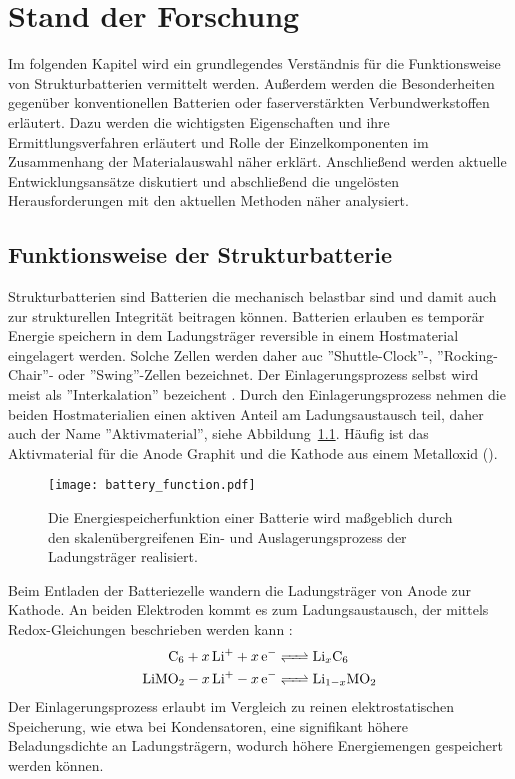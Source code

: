 \chapter{Stand der Forschung}

Im folgenden Kapitel wird ein grundlegendes Verständnis für die Funktionsweise von Strukturbatterien vermittelt werden. Außerdem werden die Besonderheiten gegenüber konventionellen Batterien oder faserverstärkten Verbundwerkstoffen erläutert. Dazu werden die wichtigsten Eigenschaften und ihre Ermittlungsverfahren erläutert und Rolle der Einzelkomponenten im Zusammenhang der Materialauswahl näher erklärt. Anschließend werden aktuelle Entwicklungsansätze diskutiert und abschließend die ungelösten Herausforderungen mit den aktuellen Methoden näher analysiert.

\section{Funktionsweise der Strukturbatterie}
Strukturbatterien sind Batterien die mechanisch belastbar sind und damit auch zur strukturellen Integrität beitragen können. 
Batterien erlauben es temporär Energie speichern in dem Ladungsträger reversible in einem Hostmaterial eingelagert werden. Solche Zellen werden daher auc ''Shuttle-Clock''\cite{Ohzuku1993}-, ''Rocking-Chair''\cite{Tarascon1993}- oder ''Swing''\cite{Bittihn1993}-Zellen bezeichnet. Der Einlagerungsprozess selbst wird meist als ''Interkalation'' bezeichent \cite{Eichinger1976}. Durch den Einlagerungsprozess nehmen die beiden Hostmaterialien einen aktiven Anteil am Ladungsaustausch teil, daher auch der Name ''Aktivmaterial'', siehe Abbildung~\ref{fig:battery_function}. Häufig ist das Aktivmaterial für die Anode Graphit und die Kathode aus einem Metalloxid (). 
\begin{figure}[h]
        \center
	\texttt{[image: battery\_function.pdf]}
		\caption{\label{fig:battery_function}Die Energiespeicherfunktion einer Batterie wird maßgeblich durch den skalenübergreifenen Ein- und Auslagerungsprozess der Ladungsträger realisiert.}
\end{figure}
Beim Entladen der Batteriezelle wandern die Ladungsträger von Anode zur Kathode. An beiden Elektroden kommt es zum Ladungsaustausch, der mittels Redox-Gleichungen beschrieben werden kann \cite{Goodenough2013}:
\begin{align}
	\ce{C_6 + x Li^+ + x e^- &<=> Li_xC_6}\\
	\ce{LiMO_2 - x Li^+ - x e^- &<=> Li_{1-x}MO_2}
\end{align}
Der Einlagerungsprozess erlaubt im Vergleich zu reinen elektrostatischen Speicherung, wie etwa bei Kondensatoren, eine signifikant höhere Beladungsdichte an Ladungsträgern, wodurch höhere Energiemengen gespeichert werden können.

